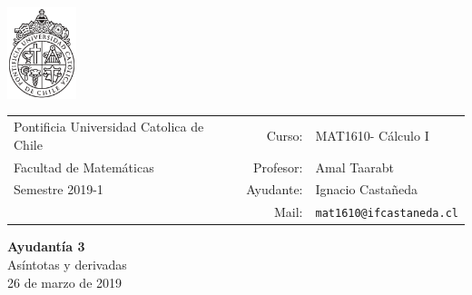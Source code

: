 \documentclass[12pt]{article}
\makeatletter
\newcommand{\ayudantia}{{\sc Ayudantía 3}}
\newcommand{\tituloayu}{Asíntotas y derivadas}
\newcommand{\fecha}{26 de marzo de 2019}
\newcommand{\sigla}{MAT1610}
\newcommand{\nombre}{Cálculo I}
\newcommand{\profesor}{Amal Taarabt}
\newcommand{\ano}{2019}
\newcommand{\semestre}{1}
\newcommand{\mail}{mat1610@ifcastaneda.cl}
\makeatother
\begin{document}
\thispagestyle{empty}

\begin{minipage}{2cm}
	\includegraphics[width=2cm]{../../../../img/logo.pdf}
	\vspace{0.5cm}
\end{minipage}
\begin{minipage}{\linewidth}
	\begin{tabular}{lrl}
		{\scriptsize\sc Pontificia Universidad Catolica de Chile} & \hspace*{0.7in}Curso: &
		\sigla  - \nombre\\
		{\sc Facultad de Matemáticas}&
		Profesor: & \profesor \\
		{\sc Semestre \ano-\semestre} & Ayudante: & {Ignacio Castañeda}\\
		& {Mail:} & \texttt{\mail}
	\end{tabular}
\end{minipage}

\vspace{-10mm}
\begin{center}
	{\LARGE\bf \ayudantia}\\
	\vspace{0.1cm}
	{\tituloayu}\\
	\vspace{0.1cm}
	\fecha\\
	\vspace{0.4cm}
\end{center}
\end{document}
